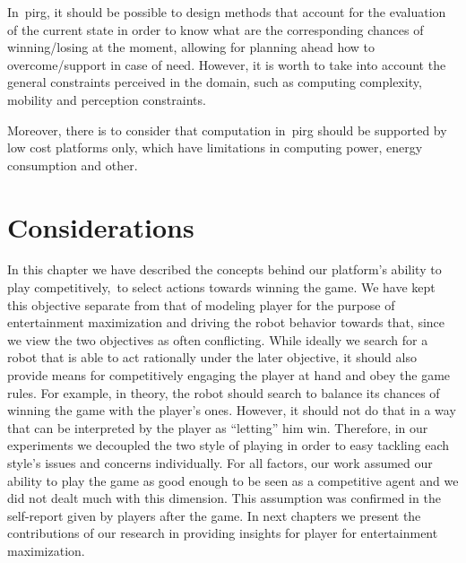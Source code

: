 In~\gls{pirg}, it should be possible to design methods that account for the evaluation of the current state in order to know what are the corresponding chances of winning/losing at the moment, allowing for planning ahead how to overcome/support in case of need. However, it is worth to take into account the general constraints perceived in the domain, such as computing complexity, mobility and perception constraints. 

Moreover, there is to consider that computation in~\gls{pirg} should be supported by low cost platforms only, which have limitations in computing power, energy consumption and other.

\section{Considerations}
In this chapter we have described the concepts behind our platform's ability to play competitively,~\ie to select actions towards winning the game. We have kept this objective separate from that of modeling player for the purpose of entertainment maximization and driving the robot behavior towards that, since we view the two objectives as often conflicting. While ideally we search for a robot that is able to act rationally under the later objective, it should also provide means for competitively engaging the player at hand and obey the game rules. For example, in theory, the robot should search to balance its chances of winning the game with the player's ones. However, it should not do that in a way that can be interpreted by the player as ``letting'' him win. Therefore, in our experiments we decoupled the two style of playing in order to easy tackling each style's issues and concerns individually. For all factors, our work assumed our ability to play the game as good enough to be seen as a competitive agent and we did not dealt much with this dimension. This assumption was confirmed in the self-report given by players after the game. In next chapters we present the contributions of our research in providing insights for player for entertainment maximization.